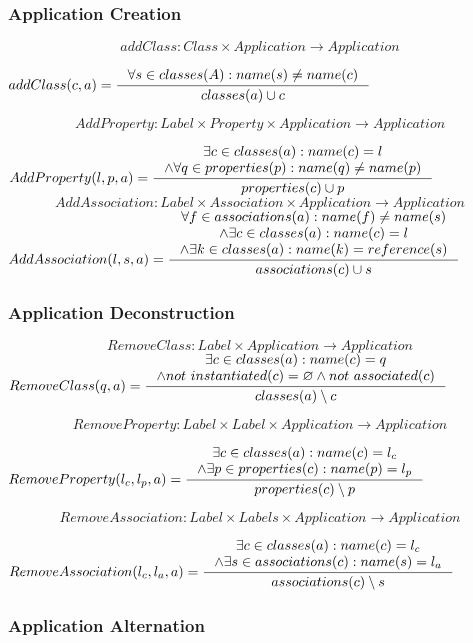 \documentclass[11pt]{article}
\begin{document}
\subsubsection{Application Creation}
$$addClass: Class \times Application \rightarrow Application $$

$
addClass(c, a) = \inference{\forall s \in classes(A) : name(s) \neq name(c)}
{classes(a) \cup c}
$

$$AddProperty : Label \times Property \times Application \rightarrow Application $$

$
AddProperty(l, p, a) = \inference{\exists c \in classes(a) : name(c) = l \\ \wedge \forall q \in properties(p) : name(q) \neq name(p)}{
 properties(c) \cup p }
$
$$AddAssociation : Label \times Association \times Application \rightarrow Application $$
$
AddAssociation(l, s, a) = \inference{\forall f \in associations(a) : name(f) \neq name(s) \\ \wedge \exists c \in classes(a) : name(c) = l \\ \wedge \exists k \in classes(a) : name(k) = reference(s) }{associations(c) \cup s}
$

\subsubsection{Application Deconstruction}
$$RemoveClass: Label \times Application \rightarrow Application $$
$
RemoveClass(q, a) = \inference{\exists c \in classes(a) : name(c) = q \\
\wedge not$ $instantiated(c) = \varnothing \wedge not$ $associated(c)}{classes(a) \setminus c }
$

$$RemoveProperty: Label \times Label \times Application \rightarrow Application $$

$
RemoveProperty(l_c, l_p, a) = \inference{\exists c \in classes(a) : name(c) = l_c \\ \wedge \exists p \in properties(c) : name(p) = l_p}{properties(c) \setminus p }
$

$$RemoveAssociation : Label \times Labels \times Application \rightarrow Application $$

$
RemoveAssociation(l_c, l_a, a) = \inference{\exists c \in classes(a) : name(c) = l_c \\ \wedge \exists s \in associations(c) : name(s) = l_a }{associations(c) \setminus s}
$

\subsubsection{Application Alternation}
\end{document}
